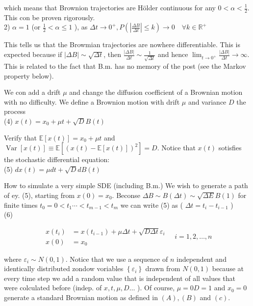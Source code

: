\documentclass[10pt]{article}
\begin{document}
which means that Brownion trajectories are Hölder continuous for any $0<\alpha<\frac{1}{2}$. This con be proven rigorously.\\
2) $\alpha=1$ (or $\frac{1}{2}<\alpha \leqslant 1$ ), as $\Delta t \rightarrow 0^{+}, P\left(\left|\frac{\Delta B}{\Delta t}\right| \leqslant k\right) \rightarrow 0 \quad \forall k \in \mathbb{R}^{+}$

This tells us that the Browmian trajectories are nowhere differentiable. This is expected because if $|\Delta B| \sim \sqrt{\Delta t}$, then $\frac{|\Delta B|}{\Delta t} \sim \frac{1}{\sqrt{\Delta t}}$ and hence $\lim _{t \rightarrow 0^{+}} \frac{|\Delta B|}{\Delta t} \rightarrow \infty$.\\
This is related to the fact that B.m. has no memory of the post (see the Markov property below).

We con add a drift $\mu$ and change the diffusion coefficient of a Brownian motion with no difficulty. We define a Brownion motion with drift $\mu$ and variance $D$ the process\\
(4) $x(t)=x_{0}+\mu t+\sqrt{D} B(t)$

Verify that $\mathbb{E}[x(t)]=x_{0}+\mu t$ and $\operatorname{Var}[x(t)] \equiv \mathbb{E}\left[(x(t)-\mathbb{E}[x(t)])^{2}\right]=D$. Notice that $x(t)$ sotisfies the stochastic differential equation:\\
(5) $d x(t)=\mu d t+\sqrt{D} d B(t)$

How to simulate a very simple SDE (including B.m.) We wish to generate a path of ey. (5), starting from $x(0)=x_{0}$. Beconse $\Delta B \sim B(\Delta t) \sim \sqrt{\Delta E} B(1)$ for finite times $t_{0}=0<t_{1} \cdots <t_{m-1}<t_{m}$ we can write (5) as ( $\Delta t=t_{i}-t_{i-1}$ )\\
(6)

$$
\begin{aligned}
x\left(t_{i}\right) & =x\left(t_{i-1}\right)+\mu \Delta t+\sqrt{D \Delta t} \varepsilon_{i} \\
x(0) & =x_{0}
\end{aligned} \quad i=1,2, \ldots, n
$$

where $\varepsilon_{i} \sim N(0,1)$. Notice that we use a sequence of $n$ independent and identically distributed zondow voriables $\left\{\varepsilon_{i}\right\}$ drawn from $N(0,1)$ because at every time step we add a random value that is independent of all values that were colculated before (indep. of $x, t, \mu, D \ldots$ ). Of course, $\mu=0 D=1$ and $x_{0}=0$ generate a standard Brownian motion as defined in $(A),(B)$ and $(c)$.
\end{document}
